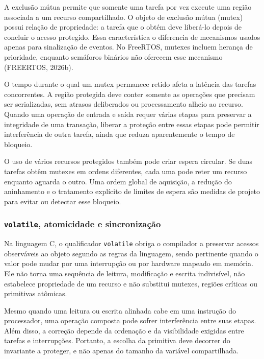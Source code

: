 \documentclass[a4paper,12pt]{article}
\begin{document}
A exclus\~ao m\'utua permite que somente uma tarefa por vez execute uma regi\~ao associada a um recurso compartilhado. O objeto de exclus\~ao m\'utua (mutex) possui rela\c{c}\~ao de propriedade: a tarefa que o obt\'em deve liber\'a-lo depois de concluir o acesso protegido. Essa caracter\'istica o diferencia de mecanismos usados apenas para sinaliza\c{c}\~ao de eventos. No FreeRTOS, mutexes incluem heran\c{c}a de prioridade, enquanto sem\'aforos bin\'arios n\~ao oferecem esse mecanismo (FREERTOS, 2026b).


O tempo durante o qual um mutex permanece retido afeta a lat\^encia das tarefas concorrentes. A regi\~ao protegida deve conter somente as opera\c{c}\~oes que precisam ser serializadas, sem atrasos deliberados ou processamento alheio ao recurso. Quando uma opera\c{c}\~ao de entrada e sa\'ida requer v\'arias etapas para preservar a integridade de uma transa\c{c}\~ao, liberar a prote\c{c}\~ao entre essas etapas pode permitir interfer\^encia de outra tarefa, ainda que reduza aparentemente o tempo de bloqueio.


O uso de v\'arios recursos protegidos tamb\'em pode criar espera circular. Se duas tarefas obt\^em mutexes em ordens diferentes, cada uma pode reter um recurso enquanto aguarda o outro. Uma ordem global de aquisi\c{c}\~ao, a redu\c{c}\~ao do aninhamento e o tratamento expl\'icito de limites de espera s\~ao medidas de projeto para evitar ou detectar esse bloqueio.


\subsubsection{\texttt{volatile}, atomicidade e sincroniza\c{c}\~ao}


Na linguagem C, o qualificador \texttt{volatile} obriga o compilador a preservar acessos observ\'aveis ao objeto segundo as regras da linguagem, sendo pertinente quando o valor pode mudar por uma interrup\c{c}\~ao ou por hardware mapeado em mem\'oria. Ele n\~ao torna uma sequ\^encia de leitura, modifica\c{c}\~ao e escrita indivis\'ivel, n\~ao estabelece propriedade de um recurso e n\~ao substitui mutexes, regi\~oes cr\'iticas ou primitivas at\^omicas.


Mesmo quando uma leitura ou escrita alinhada cabe em uma instru\c{c}\~ao do processador, uma opera\c{c}\~ao composta pode sofrer interfer\^encia entre suas etapas. Al\'em disso, a corre\c{c}\~ao depende da ordena\c{c}\~ao e da visibilidade exigidas entre tarefas e interrup\c{c}\~oes. Portanto, a escolha da primitiva deve decorrer do invariante a proteger, e n\~ao apenas do tamanho da vari\'avel compartilhada.
\end{document}
